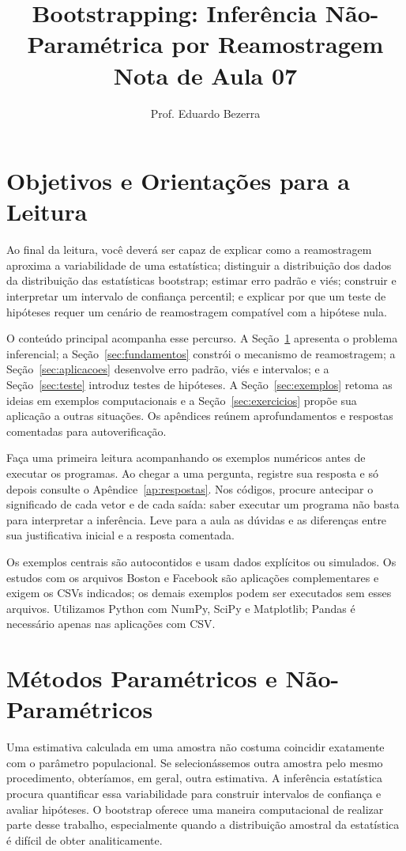 \documentclass[12pt,a4paper]{article}
\title{\vspace{-1.2cm}\Large\bfseries Bootstrapping: Inferência Não-Paramétrica por Reamostragem\\[0.3em]\normalsize Nota de Aula 07}
\author{Prof. Eduardo Bezerra}
\date{}
\begin{document}
\maketitle
\thispagestyle{fancy}
\tableofcontents
\newpage

\section*{Objetivos e Orientações para a Leitura}
Ao final da leitura, você deverá ser capaz de explicar como a reamostragem aproxima a variabilidade de uma estatística; distinguir a distribuição dos dados da distribuição das estatísticas bootstrap; estimar erro padrão e viés; construir e interpretar um intervalo de confiança percentil; e explicar por que um teste de hipóteses requer um cenário de reamostragem compatível com a hipótese nula.

O conteúdo principal acompanha esse percurso. A Seção~\ref{sec:parametricos} apresenta o problema inferencial; a Seção~\ref{sec:fundamentos} constrói o mecanismo de reamostragem; a Seção~\ref{sec:aplicacoes} desenvolve erro padrão, viés e intervalos; e a Seção~\ref{sec:teste} introduz testes de hipóteses. A Seção~\ref{sec:exemplos} retoma as ideias em exemplos computacionais e a Seção~\ref{sec:exercicios} propõe sua aplicação a outras situações. Os apêndices reúnem aprofundamentos e respostas comentadas para autoverificação.

Faça uma primeira leitura acompanhando os exemplos numéricos antes de executar os programas. Ao chegar a uma pergunta, registre sua resposta e só depois consulte o Apêndice~\ref{ap:respostas}. Nos códigos, procure antecipar o significado de cada vetor e de cada saída: saber executar um programa não basta para interpretar a inferência. Leve para a aula as dúvidas e as diferenças entre sua justificativa inicial e a resposta comentada.

Os exemplos centrais são autocontidos e usam dados explícitos ou simulados. Os estudos com os arquivos Boston e Facebook são aplicações complementares e exigem os CSVs indicados; os demais exemplos podem ser executados sem esses arquivos. Utilizamos Python com NumPy, SciPy e Matplotlib; Pandas é necessário apenas nas aplicações com CSV.

\section{Métodos Paramétricos e Não-Paramétricos}
\label{sec:parametricos}
Uma estimativa calculada em uma amostra não costuma coincidir exatamente com o parâmetro populacional. Se selecionássemos outra amostra pelo mesmo procedimento, obteríamos, em geral, outra estimativa. A inferência estatística procura quantificar essa variabilidade para construir intervalos de confiança e avaliar hipóteses. O bootstrap oferece uma maneira computacional de realizar parte desse trabalho, especialmente quando a distribuição amostral da estatística é difícil de obter analiticamente.
\end{document}
